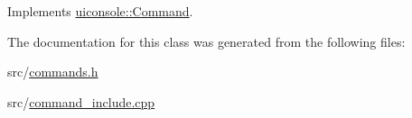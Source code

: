 Implements \hyperlink{classuiconsole_1_1Command_a5c4d205b1de13a6b3d0db73ddc7ebefa}{uiconsole::Command}.



The documentation for this class was generated from the following files:\begin{DoxyCompactItemize}
\item 
src/\hyperlink{commands_8h}{commands.h}\item 
src/\hyperlink{command__include_8cpp}{command\_\-include.cpp}\end{DoxyCompactItemize}
